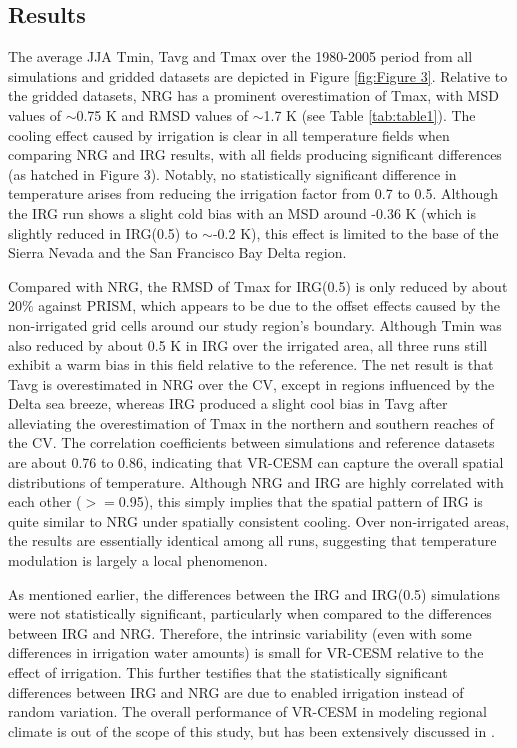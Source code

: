 \documentclass[draft,ms]{agutex}   %
\begin{document}
\begin{article}
\section{Results}

The average JJA Tmin, Tavg and Tmax over the 1980-2005 period from all simulations and gridded datasets are depicted in Figure \ref{fig:Figure 3}. Relative to the gridded datasets, NRG has a prominent overestimation of Tmax, with MSD values of $\sim$0.75 K and RMSD values of $\sim$1.7 K (see Table \ref{tab:table1}). The cooling effect caused by irrigation is clear in all temperature fields when comparing NRG and IRG results, with all fields producing significant differences (as hatched in Figure 3). Notably, no statistically significant difference in temperature arises from reducing the irrigation factor from 0.7 to 0.5. Although the IRG run shows a slight cold bias with an MSD around -0.36 K (which is slightly reduced in IRG(0.5) to $\sim$-0.2 K), this effect is limited to the base of the Sierra Nevada and the San Francisco Bay Delta region.

Compared with NRG, the RMSD of Tmax for IRG(0.5) is only reduced by about 20$\%$ against PRISM, which appears to be due to the offset effects caused by the non-irrigated grid cells around our study region's boundary. Although Tmin was also reduced by about 0.5 K in IRG over the irrigated area, all three runs still exhibit a warm bias in this field relative to the reference. The net result is that Tavg is overestimated in NRG over the CV, except in regions influenced by the Delta sea breeze, whereas IRG produced a slight cool bias in Tavg after alleviating the overestimation of Tmax in the northern and southern reaches of the CV. The correlation coefficients between simulations and reference datasets are about 0.76 to 0.86, indicating that VR-CESM can capture the overall spatial distributions of temperature. Although NRG and IRG are highly correlated with each other ($>=$0.95), this simply implies that the spatial pattern of IRG is quite similar to NRG under spatially consistent cooling. Over non-irrigated areas, the results are essentially identical among all runs, suggesting that temperature modulation is largely a local phenomenon.

As mentioned earlier, the differences between the IRG and IRG(0.5) simulations were not statistically significant, particularly when compared to the differences between IRG and NRG. Therefore, the intrinsic variability (even with some differences in irrigation water amounts) is small for VR-CESM relative to the effect of irrigation. This further testifies that the statistically significant differences between IRG and NRG are due to enabled irrigation instead of random variation. The overall performance of VR-CESM in modeling regional climate is out of the scope of this study, but has been extensively discussed in \citep{huang2016evaluation}.


\end{article}
\end{document}
